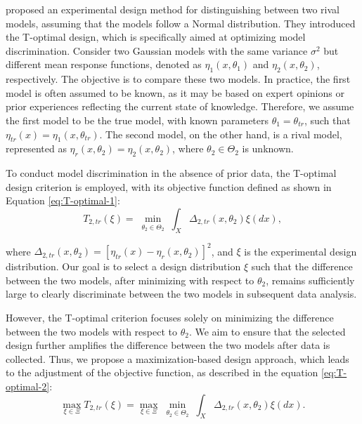 \hspace*{8mm} \cite{atkinson1975design,atkinson1975optimal} proposed an experimental design method for distinguishing between two rival models, assuming that the models follow a Normal distribution. They introduced the T-optimal design, which is specifically aimed at optimizing model discrimination. Consider two Gaussian models with the same variance $\sigma^2$ but different mean response functions, denoted as $\eta_1(x, \theta_1)$ and $\eta_2(x, \theta_2)$, respectively. The objective is to compare these two models. In practice, the first model is often assumed to be known, as it may be based on expert opinions or prior experiences reflecting the current state of knowledge. Therefore, we assume the first model to be the true model, with known parameters $\theta_1 = \theta_{tr}$, such that $\eta_{tr}(x) = \eta_1(x, \theta_{tr})$. The second model, on the other hand, is a rival model, represented as $\eta_r(x, \theta_2) = \eta_2(x, \theta_2)$, where $\theta_2 \in \Theta_2$ is unknown.

\hspace*{8mm} To conduct model discrimination in the absence of prior data, the T-optimal design criterion is employed, with its objective function defined as shown in Equation \eqref{eq:T-optimal-1}:
\begin{equation}\label{eq:T-optimal-1}
T_{2,tr}(\xi) = \min_{\substack{\theta_2 \in \Theta_2}} \int_{X} \Delta_{2,tr}(x, \theta_2) \xi(dx),
\end{equation}

where $\Delta_{2,tr}(x, \theta_2) = \left[\eta_{tr}(x) - \eta_r(x, \theta_2)\right]^2$, and $\xi$ is the experimental design distribution. Our goal is to select a design distribution $\xi$ such that the difference between the two models, after minimizing with respect to $\theta_2$, remains sufficiently large to clearly discriminate between the two models in subsequent data analysis.

\hspace*{8mm} However, the T-optimal criterion focuses solely on minimizing the difference between the two models with respect to $\theta_2$. We aim to ensure that the selected design further amplifies the difference between the two models after data is collected. Thus, we propose a maximization-based design approach, which leads to the adjustment of the objective function, as described in the equation \eqref{eq:T-optimal-2}:
\begin{equation}\label{eq:T-optimal-2}
\max_{\xi \in \Xi} T_{2,tr}(\xi) = \max_{\xi \in \Xi} \min_{\substack{\theta_2 \in \Theta_2}} \int_{X} \Delta_{2,tr}(x, \theta_2) \xi(dx).
\end{equation}

